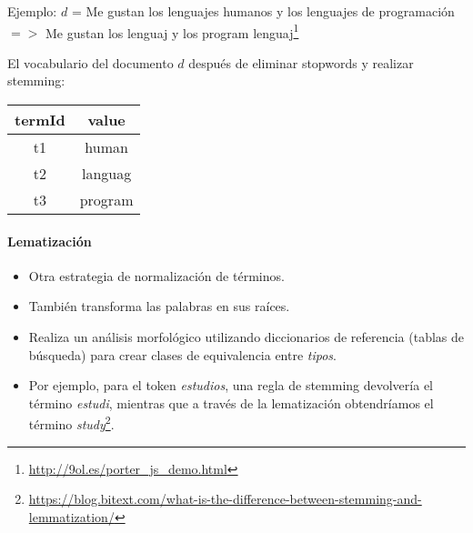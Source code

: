 Ejemplo: $d$ = Me gustan los lenguajes humanos y los lenguajes de programación $=>$ Me gustan los lenguaj y los program lenguaj\footnote{\url{http://9ol.es/porter_js_demo.html}}

El vocabulario del documento $d$ después de eliminar stopwords y realizar stemming:

\begin{table}
\centering
\begin{tabular}{c|c}
\hline
termId & value \\
\hline
t1 & human \\
t2 & languag \\
t3 & program\\
\hline
\end{tabular}
\end{table}


\paragraph{Lematización}

\begin{itemize}
   \item Otra estrategia de normalización de términos.
   \item También transforma las palabras en sus raíces.
   \item Realiza un análisis morfológico utilizando diccionarios de referencia (tablas de búsqueda) para crear clases de equivalencia entre \emph{tipos}.
   \item Por ejemplo, para el token \emph{estudios}, una regla de stemming devolvería el término \emph{estudi}, mientras que a través de la lematización obtendríamos el término \emph{study}\footnote{\url{https://blog.bitext.com/what-is-the-difference-between-stemming-and-lemmatization/}}.
\end{itemize}

